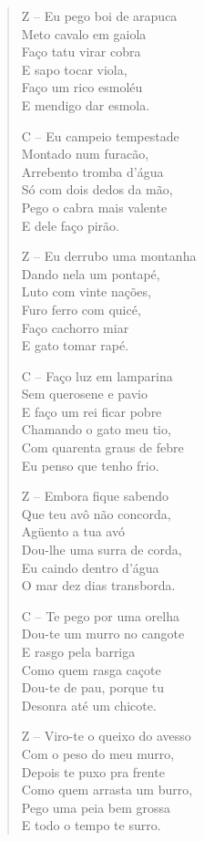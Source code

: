 \begin{verse}
Z – Eu pego boi de arapuca\\
Meto cavalo em gaiola\\
Faço tatu virar cobra\\
E sapo tocar viola,\\
Faço um rico esmoléu\\
E mendigo dar esmola.

C – Eu campeio tempestade\\
Montado num furacão,\\
Arrebento tromba d’água\\
Só com dois dedos da mão,\\
Pego o cabra mais valente\\
E dele faço pirão.
\pagebreak

Z – Eu derrubo uma montanha\\
Dando nela um pontapé,\\
Luto com vinte nações,\\
Furo ferro com quicé,\\
Faço cachorro miar\\
E gato tomar rapé.

C – Faço luz em lamparina\\
Sem querosene e pavio\\
E faço um rei ficar pobre\\
Chamando o gato meu tio,\\
Com quarenta graus de febre\\
Eu penso que tenho frio.

Z – Embora fique sabendo\\
Que teu avô não concorda,\\
Agüento a tua avó\\
Dou-lhe uma surra de corda,\\
Eu caindo dentro d’água\\
O mar dez dias transborda.

C – Te pego por uma orelha\\
Dou-te um murro no cangote\\
E rasgo pela barriga\\
Como quem rasga caçote\\
Dou-te de pau, porque tu\\
Desonra até um chicote.
\pagebreak

Z – Viro-te o queixo do avesso\\
Com o peso do meu murro,\\
Depois te puxo pra frente\\
Como quem arrasta um burro,\\
Pego uma peia bem grossa\\
E todo o tempo te surro.


\end{verse}
